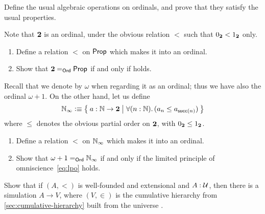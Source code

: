 \begin{ex}
  Define the usual algebraic operations on ordinals, and prove that they satisfy the usual properties.
\end{ex}

\begin{ex}\label{ex:prop-ord}
  Note that $\bool$ is an ordinal, under the obvious relation $<$ such that $\bfalse<\btrue$ only.
  \begin{enumerate}
  \item Define a relation $<$ on $\prop$ which makes it into an ordinal.
  \item Show that $\id[\ord]\bool\prop$ if and only if \LEM{} holds.
  \end{enumerate}
\end{ex}

\begin{ex}\label{ex:ninf-ord}
  Recall that we denote \nat by $\omega$ when regarding it as an ordinal; thus we have also the ordinal $\omega+1$.
  On the other hand, let us define
  \[ \nat_\infty \defeq \setof{a:\nat\to\bool | \fall{n:\nat} (a_n \le a_{\suc(n)}) } \]
  where $\le$ denotes the obvious partial order on $\bool$, with $\bfalse\le\btrue$.
  \begin{enumerate}
  \item Define a relation $<$ on $\nat_\infty$ which makes it into an ordinal.
  \item Show that $\id[\ord]{\omega+1}{\nat_\infty}$ if and only if the limited principle of omniscience~\eqref{eq:lpo} holds.
  \end{enumerate}
\end{ex}

\begin{ex}
  Show that if $(A,<)$ is well-founded and extensional and $A:\UU$, then there is a simulation $A\to V$, where $(V,\in)$ is the cumulative hierarchy from \autoref{sec:cumulative-hierarchy} built from the universe \UU.
\end{ex}

